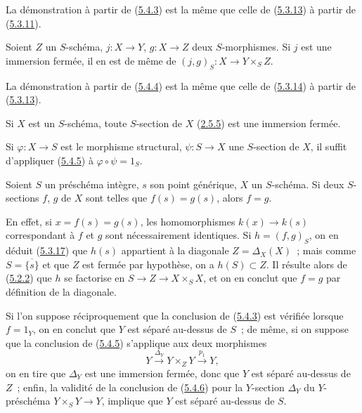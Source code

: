 La démonstration à partir de (\hyperref[I.5.4.3-fr]{5.4.3}) est la même que
celle de (\hyperref[I.5.3.13-fr]{5.3.13}) à partir de
(\hyperref[I.5.3.11-fr]{5.3.11}).

\begin{corollary}[5.4.5]
\label{I.5.4.5-fr}
Soient $Z$ un $S$-schéma, $j:X\to Y$, $g:X\to Z$ deux $S$-morphismes. Si $j$
est une immersion fermée, il en est de même de
$(j,g)_S:X\to Y\times_S Z$.
\end{corollary}

La démonstration à partir de (\hyperref[I.5.4.4-fr]{5.4.4}) est la même que
celle de (\hyperref[I.5.3.14-fr]{5.3.14}) à partir de
(\hyperref[I.5.3.13-fr]{5.3.13}).

\begin{corollary}[5.4.6]
\label{I.5.4.6-fr}
Si $X$ est un $S$-schéma, toute $S$-section de $X$
(\hyperref[I.2.5.5-fr]{2.5.5}) est une immersion fermée.
\end{corollary}

Si $\varphi:X\to S$ est le morphisme structural, $\psi:S\to X$ une
$S$-section de $X$, il suffit d'appliquer
(\hyperref[I.5.4.5-fr]{5.4.5}) à $\varphi\circ\psi=1_S$.

\begin{corollary}[5.4.7]
\label{I.5.4.7-fr}
Soient $S$ un préschéma intègre, $s$ son point générique, $X$ un $S$-schéma.
Si deux $S$-sections $f$, $g$ de $X$ sont telles que $f(s)=g(s)$, alors
$f=g$.
\end{corollary}

En effet, si $x=f(s)=g(s)$, les homomorphismes $k(x)\to k(s)$ correspondant à
$f$ et $g$ sont nécessairement identiques. Si $h=(f,g)_S$, on en déduit
(\hyperref[I.5.3.17-fr]{5.3.17}) que $h(s)$ appartient à la diagonale
$Z=\Delta_X(X)$~; mais comme $S=\overline{\{s\}}$ et que $Z$ est fermée par
hypothèse, on a $h(S)\subset Z$. Il résulte alors de
(\hyperref[I.5.2.2-fr]{5.2.2}) que $h$ se factorise en
$S\to Z\to X\times_S X$, et on en conclut que $f=g$ par définition de la
diagonale.

\begin{remark}[5.4.8]
\label{I.5.4.8-fr}
Si l'on suppose réciproquement que la conclusion de
(\hyperref[I.5.4.3-fr]{5.4.3}) est vérifiée lorsque $f=1_Y$, on en conclut
que $Y$ est séparé au-dessus de $S$~; de même, si on suppose que la conclusion
de (\hyperref[I.5.4.5-fr]{5.4.5}) s'applique aux deux morphismes
\[
  Y\xrightarrow{\Delta_Y}Y\times_Z Y\xrightarrow{p_1}Y,
\]
on en tire que $\Delta_Y$ est une immersion fermée, donc que $Y$ est séparé
au-dessus de $Z$~; enfin, la validité de la conclusion de
(\hyperref[I.5.4.6-fr]{5.4.6}) pour la $Y$-section $\Delta_Y$ du
$Y$-préschéma $Y\times_S Y\to Y$, implique que $Y$ est séparé au-dessus de
$S$.
\end{remark}

